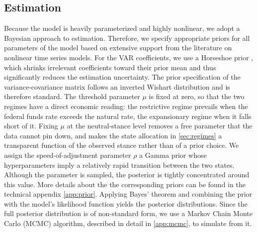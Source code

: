 \subsection{Estimation}
Because the model is heavily parameterized and highly nonlinear, we adopt a Bayesian approach to estimation. Therefore, we specify appropriate priors for all parameters of the model based on extensive support from the literature on nonlinear time series models. 
For the VAR coefficients, we use a Horseshoe prior \citep{carvalho2010horseshoe}, which shrinks irrelevant coefficients toward their prior mean and thus significantly reduces the estimation uncertainty. The prior specification of the variance-covariance matrix follows an inverted Wishart distribution and is therefore standard. The threshold parameter $\mu$ is fixed at zero, so that the two regimes have a direct economic reading: the restrictive regime prevails when the federal funds rate exceeds the natural rate, the expansionary regime when it falls short of it. Fixing $\mu$ at the neutral-stance level removes a free parameter that the data cannot pin down, and makes the state allocation in \autoref{sec:regimes} a transparent function of the observed stance rather than of a prior choice. We assign the speed-of-adjustment parameter $\rho$ a Gamma prior whose hyperparameters imply a relatively rapid transition between the two states. Although the parameter is sampled, the posterior is tightly concentrated around this value. %
More details about the the corresponding priors can be found in the technical appendix \autoref{app:prior}. Applying Bayes' theorem and combining the prior with the model's likelihood function yields the posterior distributions. Since the full posterior distribution is of non-standard form, we use a Markov Chain Monte Carlo (MCMC) algorithm, described in detail in \autoref{app:mcmc}, to simulate from it.
